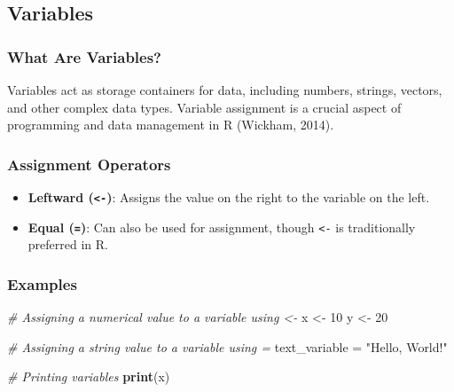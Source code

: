 \documentclass[
  b5paper]{book}
\newenvironment{Shaded}{\begin{snugshade}}{\end{snugshade}}
\newcommand{\CommentTok}[1]{\textcolor[rgb]{0.56,0.35,0.01}{\textit{#1}}}
\newcommand{\DecValTok}[1]{\textcolor[rgb]{0.00,0.00,0.81}{#1}}
\newcommand{\FunctionTok}[1]{\textcolor[rgb]{0.13,0.29,0.53}{\textbf{#1}}}
\newcommand{\NormalTok}[1]{#1}
\newcommand{\OtherTok}[1]{\textcolor[rgb]{0.56,0.35,0.01}{#1}}
\newcommand{\StringTok}[1]{\textcolor[rgb]{0.31,0.60,0.02}{#1}}
\providecommand{\tightlist}{%
  \setlength{\itemsep}{0pt}\setlength{\parskip}{0pt}}
\begin{document}
\hypertarget{variables}{%
\subsection*{Variables}\label{variables}}

\hypertarget{what-are-variables}{%
\subsubsection*{What Are Variables?}\label{what-are-variables}}

Variables act as storage containers for data, including numbers, strings, vectors, and other complex data types. Variable assignment is a crucial aspect of programming and data management in R (Wickham, 2014).

\hypertarget{assignment-operators}{%
\subsubsection*{Assignment Operators}\label{assignment-operators}}

\begin{itemize}
\tightlist
\item
  \textbf{Leftward (\texttt{\textless{}-})}: Assigns the value on the right to the variable on the left.
\item
  \textbf{Equal (\texttt{=})}: Can also be used for assignment, though \texttt{\textless{}-} is traditionally preferred in R.
\end{itemize}

\hypertarget{examples-1}{%
\subsubsection*{Examples}\label{examples-1}}

\begin{Shaded}
\begin{Highlighting}[]
\CommentTok{\# Assigning a numerical value to a variable using \textless{}{-}}
\NormalTok{x }\OtherTok{\textless{}{-}} \DecValTok{10}
\NormalTok{y }\OtherTok{\textless{}{-}} \DecValTok{20}

\CommentTok{\# Assigning a string value to a variable using =}
\NormalTok{text\_variable }\OtherTok{=} \StringTok{"Hello, World!"}

\CommentTok{\# Printing variables}
\FunctionTok{print}\NormalTok{(x)}
\end{Highlighting}
\end{Shaded}
\end{document}
